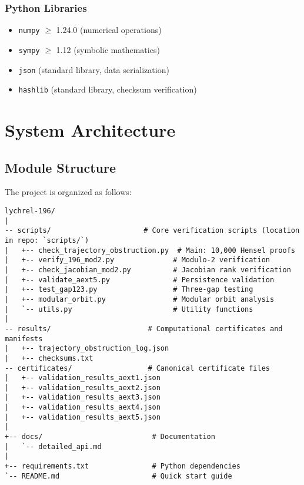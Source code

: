 \documentclass[11pt,a4paper]{article}
\newcommand{\code}[1]{\texttt{#1}}
\begin{document}
\subsubsection{Python Libraries}
\begin{itemize}
\item \code{numpy} $\geq$ 1.24.0 (numerical operations)
\item \code{sympy} $\geq$ 1.12 (symbolic mathematics)
\item \code{json} (standard library, data serialization)
\item \code{hashlib} (standard library, checksum verification)
\end{itemize}

\section{System Architecture}

\subsection{Module Structure}

The project is organized as follows:

\begin{lstlisting}[style=bashstyle, caption={Project Directory Structure}]
lychrel-196/
|
-- scripts/                      # Core verification scripts (location in repo: `scripts/`)
|   +-- check_trajectory_obstruction.py  # Main: 10,000 Hensel proofs
|   +-- verify_196_mod2.py              # Modulo-2 verification
|   +-- check_jacobian_mod2.py          # Jacobian rank verification
|   +-- validate_aext5.py               # Persistence validation
|   +-- test_gap123.py                  # Three-gap testing
|   +-- modular_orbit.py                # Modular orbit analysis
|   `-- utils.py                        # Utility functions
|
-- results/                       # Computational certificates and manifests
|   +-- trajectory_obstruction_log.json
|   +-- checksums.txt
-- certificates/                  # Canonical certificate files
|   +-- validation_results_aext1.json
|   +-- validation_results_aext2.json
|   +-- validation_results_aext3.json
|   +-- validation_results_aext4.json
|   +-- validation_results_aext5.json
|
+-- docs/                          # Documentation
|   `-- detailed_api.md
|
+-- requirements.txt               # Python dependencies
`-- README.md                      # Quick start guide
\end{lstlisting}
\end{document}
